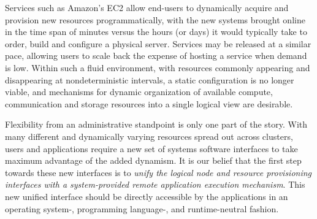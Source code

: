 \documentclass{sig-alternate}
\begin{document}
Services such as Amazon's EC2 allow end-users to dynamically acquire and provision
new resources programmatically, with the new systems brought online in
the time span of minutes versus the hours (or days) it would typically
take to order, build and configure a physical server.  Services may be 
released at a similar pace, allowing users to scale back the expense 
of hosting a service when demand is low.
Within such a fluid environment, with resources commonly appearing and 
disappearing at nondeterministic intervals, a static configuration is 
no longer viable, and mechanisms for dynamic organization of available
compute, communication and storage resources into a single logical view
are desirable.



Flexibility from an administrative standpoint is only one part of the
story.
With many different and dynamically varying resources spread out across 
clusters, users and applications require a new set of systems software
interfaces to take maximum advantage of the added dynamism.
It is our belief that the first step towards these new interfaces is 
to {\it unify the logical node and resource provisioning interfaces with a
system-provided remote application execution mechanism}.  This new unified
interface should be directly accessible by the applications in an operating
system-, programming language-, and runtime-neutral fashion.
\end{document}
